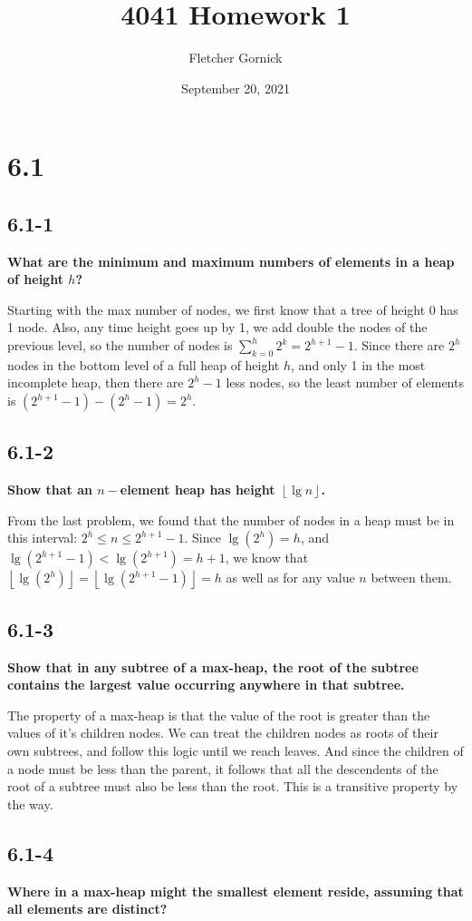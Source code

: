 \documentclass[11pt]{article}
\title{4041 Homework 1}
\author{Fletcher Gornick}
\date{September 20, 2021}
\def\lf{\left\lfloor}
\def\rf{\right\rfloor}
\begin{document}
 \maketitle 
 \section*{6.1}
 \subsection*{6.1-1}
  \textbf{What are the minimum and maximum numbers of elements in a heap of height $h$?}

  Starting with the max number of nodes, we first know that a tree of height 0 has 1 node.
  Also, any time height goes up by 1, we add double the nodes of the previous level, so the
  number of nodes is $\sum_{k=0}^{h}2^{k} = 2^{h+1}-1$.  Since there are $2^h$ nodes in the
  bottom level of a full heap of height $h$, and only 1 in the most incomplete heap, then 
  there are $2^h-1$ less nodes, so the least number of elements is $(2^{h+1}-1) - (2^h-1) = 2^h$.

 \subsection*{6.1-2}
  \textbf{Show that an $n-$element heap has height $\lf \lg n \rf$.}

  From the last problem, we found that the number of nodes in a heap must be in this interval:
  $2^h \leq n \leq 2^{h+1}-1$. Since $\lg{(2^h)} = h$, and $\lg{(2^{h+1}-1)} < \lg{(2^{h+1})} = h+1$,
  we know that $\lf \lg{(2^h)} \rf = \lf \lg{(2^{h+1}-1)} \rf = h$ as well as for any value $n$
  between them.
 \subsection*{6.1-3}
  \textbf{Show that in any subtree of a max-heap, the root of the subtree contains the largest 
  value occurring anywhere in that subtree.}

  The property of a max-heap is that the value of the root is greater than the values of it's 
  children nodes.  We can treat the children nodes as roots of their own subtrees, and follow
  this logic until we reach leaves.  And since the children of a node must be less than the
  parent, it follows that all the descendents of the root of a subtree must also be less than
  the root.  This is a transitive property by the way.
 \subsection*{6.1-4}
  \textbf{Where in a max-heap might the smallest element reside, assuming that all elements are 
  distinct?}
\end{document}
